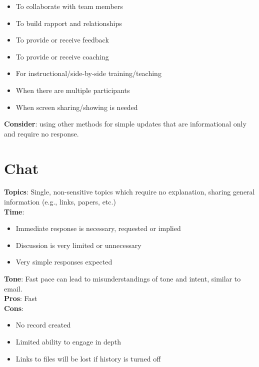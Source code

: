 \documentclass[
  letterpaper,
  DIV=11,
  numbers=noendperiod]{scrreprt}
\providecommand{\tightlist}{%
  \setlength{\itemsep}{0pt}\setlength{\parskip}{0pt}}\usepackage{longtable,booktabs,array}
\begin{document}
\begin{itemize}
\tightlist
\item
  To collaborate with team members\\
\item
  To build rapport and relationships\\
\item
  To provide or receive feedback\\
\item
  To provide or receive coaching\\
\item
  For instructional/side-by-side training/teaching\\
\item
  When there are multiple participants\\
\item
  When screen sharing/showing is needed
\end{itemize}

\textbf{Consider}: using other methods for simple updates that are
informational only and require no response.

\section{Chat}\label{chat}

\textbf{Topics}: Single, non-sensitive topics which require no
explanation, sharing general information (e.g., links, papers, etc.)\\
\textbf{Time}:

\begin{itemize}
\tightlist
\item
  Immediate response is necessary, requested or implied
\item
  Discussion is very limited or unnecessary
\item
  Very simple responses expected
\end{itemize}

\textbf{Tone}: Fast pace can lead to misunderstandings of tone and
intent, similar to email.\\
\textbf{Pros}: Fast\\
\textbf{Cons}:

\begin{itemize}
\tightlist
\item
  No record created\\
\item
  Limited ability to engage in depth\\
\item
  Links to files will be lost if history is turned off
\end{itemize}
\end{document}
